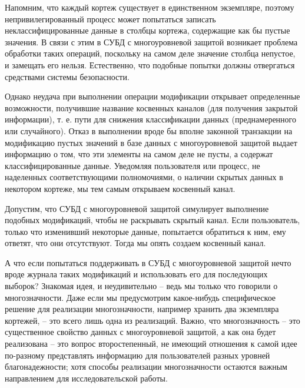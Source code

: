 {Напомним, что каждый кортеж существует в единственном экземпляре, поэтому непривилегированный процесс может попытаться записать неклассифицированные данные в столбцы кортежа, содержащие как бы пустые значения. В связи с этим в СУБД с многоуровневой защитой возникает проблема обработки таких операций, поскольку на самом деле значение столбца непустое, и замещать его нельзя. Естественно, что подобные попытки должны отвергаться средствами системы безопасности.

Однако неудача при выполнении операции модификации открывает определенные возможности, получившие название косвенных каналов (для получения закрытой информации), т. е. пути для снижения классификации данных (преднамеренного или случайного). Отказ в выполнении вроде бы вполне законной транзакции на модификацию пустых значений в базе данных с многоуровневой защитой выдает информацию о том, что эти элементы на самом деле не пусты, а содержат классифицированные данные. Уведомляя пользователя или процесс, не наделенных соответствующими полномочиями, о наличии скрытых данных в некотором кортеже, мы тем самым открываем косвенный канал.

Допустим, что СУБД с многоуровневой защитой симулирует выполнение подобных модификаций, чтобы не раскрывать скрытый канал. Если пользователь, только что изменивший некоторые данные, попытается обратиться к ним, ему ответят, что они отсутствуют. Тогда мы опять создаем косвенный канал.

А что если попытаться поддерживать в СУБД с многоуровневой защитой нечто вроде журнала таких модификаций и использовать его для последующих выборок? Знакомая идея, и неудивительно -- ведь мы только что говорили о многозначности. Даже если мы предусмотрим какое-нибудь специфическое решение для реализации многозначности, например хранить два экземпляра кортежей, -- это всего лишь одна из реализаций. Важно, что многозначность -- это существенное свойство данных с многоуровневой защитой, а как она будет реализована -- это вопрос второстепенный, не имеющий отношения к самой идее по-разному представлять информацию для пользователей разных уровней благонадежности; хотя способы реализации многозначности остаются важным направлением для исследовательской работы.

}
